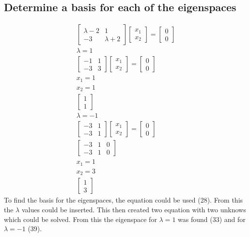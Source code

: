 \documentclass[12pt, a4paper]{article}
\begin{document}
		\subsection{Determine a basis for each of the eigenspaces}
			\begin{align}
				\begin{bmatrix}\lambda-2 & 1\\-3&\lambda+2\end{bmatrix}\begin{bmatrix}x_1\\x_2\end{bmatrix}=\begin{bmatrix}0\\0\end{bmatrix}\\
				\lambda = 1\\
				\begin{bmatrix}-1 & 1\\-3&3\end{bmatrix}\begin{bmatrix}x_1\\x_2\end{bmatrix}=\begin{bmatrix}0\\0\end{bmatrix}\\
				x_1=1\\
				x_2=1\\
				\begin{bmatrix}1\\1\end{bmatrix}\\[4mm]
				\lambda=-1\\
				\begin{bmatrix}-3 & 1\\-3&1\end{bmatrix}\begin{bmatrix}x_1\\x_2\end{bmatrix}=\begin{bmatrix}0\\0\end{bmatrix}\\
				\begin{bmatrix}-3&1&0\\-3&1&0\end{bmatrix}\\
				x_1=1\\
				x_2=3\\
				\begin{bmatrix}1\\3\end{bmatrix}
			\end{align}
			To find the basis for the eigenspaces, the equation could be used (28). From this the $\lambda$ values could be inserted. This then created two equation with two unknows which could be solved. From this the eigenspace for $\lambda=1$ was found (33) and for $\lambda=-1$ (39).
\end{document}
